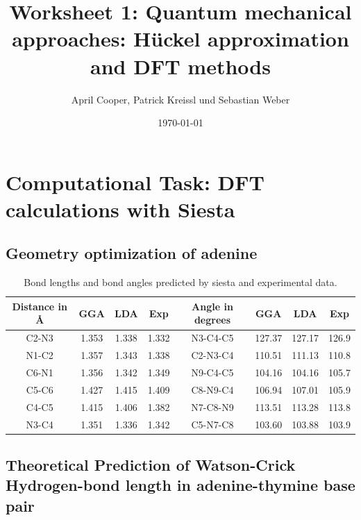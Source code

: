 \documentclass[12pt,a4paper]{scrartcl}
\author{April Cooper, Patrick Kreissl und Sebastian Weber}
\title{Worksheet 1: Quantum mechanical approaches:
Hückel approximation and DFT methods}
\date{\today}
\begin{document}
\maketitle
\tableofcontents
\newpage

\section{Computational Task: DFT calculations with Siesta}

\subsection{Geometry optimization of adenine}

\begin{table}
\begin{tabular}{c|c|c|c||c|c|c|c} 
Distance in \r{A} & GGA & LDA & Exp\footnotemark[1] & Angle in degrees & GGA & LDA  & Exp\footnotemark[1]\\ 
\hline 
\hline
C2-N3 & 1.353 & 1.338 & 1.332 & N3-C4-C5 & 127.37 & 127.17 & 126.9 \\ 
\hline 
N1-C2 & 1.357 & 1.343 & 1.338 & C2-N3-C4 & 110.51 & 111.13 & 110.8 \\ 
\hline 
C6-N1 & 1.356 & 1.342 & 1.349 & N9-C4-C5 & 104.16 & 104.16 & 105.7 \\ 
\hline 
C5-C6 & 1.427 & 1.415 & 1.409 & C8-N9-C4 & 106.94 & 107.01 & 105.9 \\ 
\hline 
C4-C5 & 1.415 & 1.406 & 1.382 & N7-C8-N9 & 113.51 & 113.28 & 113.8 \\ 
\hline 
N3-C4 & 1.351 & 1.336 & 1.342 & C5-N7-C8 & 103.60 & 103.88 & 103.9 \\  
\end{tabular} 
\caption{Bond lengths and bond angles predicted by siesta and experimental data.}\label{tab:distances_and_angles}
\end{table}


\newpage

\subsection{Theoretical Prediction of Watson-Crick Hydrogen-bond length in
adenine-thymine base pair}
\end{document}
